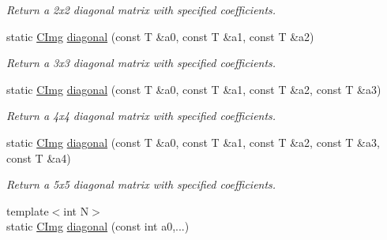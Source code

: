 \begin{DoxyCompactItemize}
\begin{DoxyCompactList}\small\item\em Return a 2x2 diagonal matrix with specified coefficients. \end{DoxyCompactList}\item 
\hypertarget{structcimg__library_1_1_c_img_a941de2c2829d49ed0039540cd091b8ce}{static \hyperlink{structcimg__library_1_1_c_img}{C\-Img} \hyperlink{structcimg__library_1_1_c_img_a941de2c2829d49ed0039540cd091b8ce}{diagonal} (const T \&a0, const T \&a1, const T \&a2)}\label{structcimg__library_1_1_c_img_a941de2c2829d49ed0039540cd091b8ce}

\begin{DoxyCompactList}\small\item\em Return a 3x3 diagonal matrix with specified coefficients. \end{DoxyCompactList}\item 
\hypertarget{structcimg__library_1_1_c_img_a94c3a257975f8e4ead2e4455c54ea134}{static \hyperlink{structcimg__library_1_1_c_img}{C\-Img} \hyperlink{structcimg__library_1_1_c_img_a94c3a257975f8e4ead2e4455c54ea134}{diagonal} (const T \&a0, const T \&a1, const T \&a2, const T \&a3)}\label{structcimg__library_1_1_c_img_a94c3a257975f8e4ead2e4455c54ea134}

\begin{DoxyCompactList}\small\item\em Return a 4x4 diagonal matrix with specified coefficients. \end{DoxyCompactList}\item 
\hypertarget{structcimg__library_1_1_c_img_afd91b6139771947a4340ce819d817993}{static \hyperlink{structcimg__library_1_1_c_img}{C\-Img} \hyperlink{structcimg__library_1_1_c_img_afd91b6139771947a4340ce819d817993}{diagonal} (const T \&a0, const T \&a1, const T \&a2, const T \&a3, const T \&a4)}\label{structcimg__library_1_1_c_img_afd91b6139771947a4340ce819d817993}

\begin{DoxyCompactList}\small\item\em Return a 5x5 diagonal matrix with specified coefficients. \end{DoxyCompactList}\item 
\hypertarget{structcimg__library_1_1_c_img_af5925191263e4d226bb8909569090e59}{{\footnotesize template$<$int N$>$ }\\static \hyperlink{structcimg__library_1_1_c_img}{C\-Img} \hyperlink{structcimg__library_1_1_c_img_af5925191263e4d226bb8909569090e59}{diagonal} (const int a0,...)}\label{structcimg__library_1_1_c_img_af5925191263e4d226bb8909569090e59}


\end{DoxyCompactItemize}
